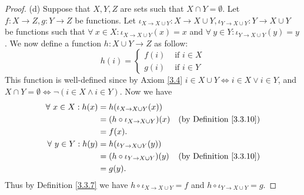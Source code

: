 \begin{proof}{(d)}
    Suppose that \(X, Y, Z\) are sets such that \(X \cap Y = \emptyset\).
    Let \(f : X \to Z, g : Y \to Z\) be functions.
    Let \(\iota_{X \to X \cup Y} : X \to X \cup Y, \iota_{Y \to X \cup Y} : Y \to X \cup Y\) be functions such that \(\forall\ x \in X : \iota_{X \to X \cup Y}(x) = x\) and \(\forall\ y \in Y : \iota_{Y \to X \cup Y}(y) = y\).
    We now define a function \(h : X \cup Y \to Z\) as follow:
    \[
        h(i) = \begin{cases}
            f(i) & \text{ if } i \in X \\
            g(i) & \text{ if } i \in Y
        \end{cases}
    \]
    This function is well-defined since by Axiom \ref{3.4} \(i \in X \cup Y \iff i \in X \lor i \in Y\), and \(X \cap Y = \emptyset \iff \lnot(i \in X \land i \in Y)\).
    Now we have
    \begin{align*}
        \forall\ x \in X : h(x) & = h(\iota_{X \to X \cup Y}(x))                                              \\
                                & = (h \circ \iota_{X \to X \cup Y})(x) & \text{(by Definition \ref{3.3.10})} \\
                                & = f(x).                                                                     \\
        \forall\ y \in Y : h(y) & = h(\iota_{Y \to X \cup Y}(y))                                              \\
                                & = (h \circ \iota_{Y \to X \cup Y})(y) & \text{(by Definition \ref{3.3.10})} \\
                                & = g(y).
    \end{align*}
    Thus by Definition \ref{3.3.7} we have \(h \circ \iota_{X \to X \cup Y} = f\) and \(h \circ \iota_{Y \to X \cup Y} = g\).


\end{proof}
